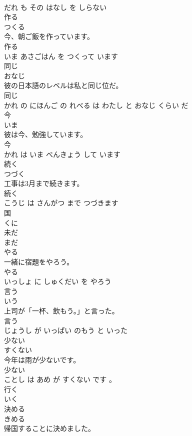 \documentclass[8pt]{extreport}
\begin{document}
\begin{CJK}{UTF8}{min}
\\	だれ も その はなし を しらない			
\\	作る	
\\	つくる			
\\	今、朝ご飯を作っています。	
\\	作る 
\\	いま あさごはん を つくって います			
\\	同じ	
\\	おなじ			
\\	彼の日本語のレベルは私と同じ位だ。	
\\	同じ 
\\	かれ の にほんご の れべる は わたし と おなじ くらい だ			
\\	今	
\\	いま			
\\	彼は今、勉強しています。	
\\	今 
\\	かれ は いま べんきょう して います			
\\	続く	
\\	つづく			
\\	工事は3月まで続きます。	
\\	続く 
\\	こうじ は さんがつ まで つづきます			
\\	国	
\\	くに			
\\	未だ	
\\	まだ			
\\	やる	
\\	一緒に宿題をやろう。	
\\	やる 
\\	いっしょ に しゅくだい を やろう			
\\	言う	
\\	いう			
\\	上司が「一杯、飲もう。」と言った。	
\\	言う 
\\	じょうし が いっぱい のもう と いった			
\\	少ない	
\\	すくない			
\\	今年は雨が少ないです。	
\\	少ない 
\\	ことし は あめ が すくない です 。			
\\	行く	
\\	いく			
\\	決める	
\\	きめる			
\\	帰国することに決めました。	

\end{CJK}
\end{document}
